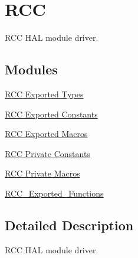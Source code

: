 \hypertarget{group___r_c_c}{}\section{R\+CC}
\label{group___r_c_c}


R\+CC H\+AL module driver.  


\subsection*{Modules}
\begin{DoxyCompactItemize}
\item 
\hyperlink{group___r_c_c___exported___types}{R\+C\+C Exported Types}
\item 
\hyperlink{group___r_c_c___exported___constants}{R\+C\+C Exported Constants}
\item 
\hyperlink{group___r_c_c___exported___macros}{R\+C\+C Exported Macros}
\item 
\hyperlink{group___r_c_c___private___constants}{R\+C\+C Private Constants}
\item 
\hyperlink{group___r_c_c___private___macros}{R\+C\+C Private Macros}
\item 
\hyperlink{group___r_c_c___exported___functions}{R\+C\+C\+\_\+\+Exported\+\_\+\+Functions}
\end{DoxyCompactItemize}


\subsection{Detailed Description}
R\+CC H\+AL module driver. 

